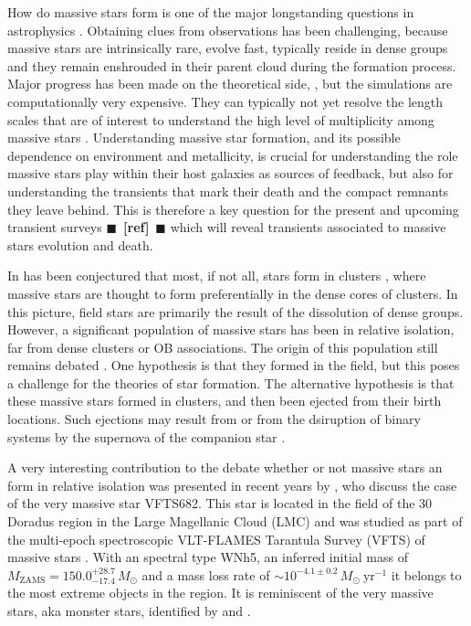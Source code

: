 \documentclass{aa}
\newcommand{\todo}[1]{{\large $\blacksquare$~\textbf{\color{red}[#1]}}~$\blacksquare$}
\newcommand{\SdM}[1]{{{\color{Wildstrawberry}\bf{#1}}}}
\begin{document}
\SdM{

How do massive stars form is one of the major longstanding questions in astrophysics
\citep[e.g.,][]{zinnecker:07}. Obtaining clues from observations has been challenging, because massive stars are intrinsically rare, 
evolve fast, typically reside in dense groups and they remain enshrouded in their parent cloud during the formation
process.  Major progress has been made on the theoretical side,  \citep[e.g.][]{Kuiper+2015Rosen+2016}, but the simulations are computationally very expensive. They can typically not yet resolve the length scales that are of interest to understand the 
high level of multiplicity among massive stars  \citep[][]{sana:12,sana:17}.  Understanding massive star formation, and its possible dependence on environment and metallicity, is crucial for understanding the role massive stars play within their host galaxies as sources of feedback, but also for understanding the transients that mark their death and the compact remnants they leave behind.  This is therefore a key question for the present and upcoming transient surveys \citep[e.g., LSST, BlackGem, LIGO/Virgo O3][]{}\todo{ref} which  will reveal transients associated to massive stars
evolution and death.

In has been conjectured that most, if not all, stars form in clusters \cite{lada:03}, where massive stars are thought to  form preferentially in the dense cores of clusters. In this picture, field stars are primarily the result of the dissolution of dense groups. 
 However, a significant population of massive stars has been  in relative isolation,  far from dense clusters or OB associations. The origin of this population still remains debated \citep{Lamb+2016}.   One hypothesis is that they  formed in the field, but this poses a challenge for the theories of star formation.  The alternative hypothesis is that these massive stars  formed in clusters, and then been ejected from their birth locations.  Such ejections may result from   \citep[e,g,][]{poveda:67} or from the dsiruption of binary systems by the supernova of the companion star  \citep[][]{zwicky:57, blaauw:61}. 
 
 A very interesting contribution to the debate whether or not massive stars an form in relative isolation was presented in recent years by  \cite{bestenlehner:11}, who discuss the case of the very massive star VFTS682.   This star is located in the field of the 30 Doradus region in the Large Magellanic Cloud (LMC) and was studied as part of the multi-epoch spectroscopic VLT-FLAMES Tarantula Survey (VFTS) of massive stars \citep{Evans+2011}.  With an spectral type  WNh5, an inferred initial mass of $M_\mathrm{ZAMS}=150.0^{+28.7}_{-17.4}\,M_\odot$  and a mass loss rate of  $\sim10^{-4.1\pm0.2}\,M_\odot \ \mathrm{yr}^{-1}$  \citep[][]{bestenlehner:11,schneider:18} it belongs to the most extreme objects in the region.  It is reminiscent of the very  massive stars, aka monster stars, identified by  \citet{Crowther+2010} and \citet{Crowther+2016}. 
 
}
\end{document}
